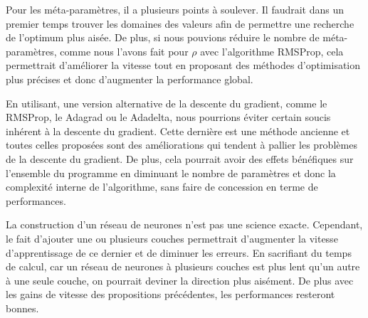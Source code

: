 \documentclass[a4paper, 11pt]{article}
\begin{document}
Pour les méta-paramètres, il a plusieurs points à soulever. Il faudrait dans un premier temps trouver les domaines des valeurs afin de permettre
une recherche de l'optimum plus aisée. De plus, si nous pouvions réduire le nombre de méta-paramètres, comme nous l'avons fait pour $\rho$ avec l'algorithme
RMSProp, cela permettrait d'améliorer la vitesse tout en proposant des méthodes d'optimisation plus précises et donc d'augmenter la performance global.

En utilisant, une version alternative de la descente du gradient, comme le RMSProp, le Adagrad ou le Adadelta, nous pourrions éviter certain soucis
inhérent à la descente du gradient. Cette dernière est une méthode ancienne et toutes celles proposées sont des améliorations qui tendent à pallier les
problèmes de la descente du gradient. De plus, cela pourrait avoir des effets bénéfiques sur l'ensemble du programme en diminuant le nombre de paramètres
et donc la complexité interne de l'algorithme, sans faire de concession en terme de performances.

La construction d'un réseau de neurones n'est pas une science exacte. Cependant, le fait d'ajouter une ou plusieurs couches permettrait d'augmenter la 
vitesse d'apprentissage de ce dernier et de diminuer les erreurs. En sacrifiant du temps de calcul, car un réseau de neurones à plusieurs couches est plus
lent qu'un autre à une seule couche, on pourrait deviner la direction plus aisément. De plus avec les gains de vitesse des propositions précédentes, les
performances resteront bonnes.

\newpage

\nocite{*}

\end{document}
